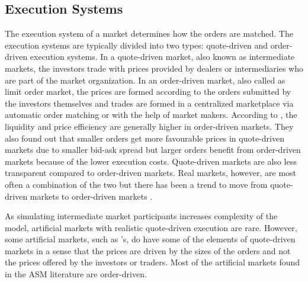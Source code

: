 \subsection{Execution Systems}
The execution system of a market determines how the orders are matched.
The execution systems are typically divided into two types:
quote-driven and order-driven execution systems. In a quote-driven market, also known
as intermediate markets, the investors trade with prices provided 
by dealers or intermediaries who are part of the market organization. 
In an order-driven market, also called as limit order market, 
the prices are formed according to the orders submitted by the 
investors themselves and trades are formed in a centralized marketplace 
via automatic order matching or with the help of market makers. 
\citep{Baru17} According to \citet{MALINOVA2013104},
the liquidity and price efficiency are generally higher in order-driven 
markets. They also found out that smaller orders get more favourable prices in 
quote-driven markets due to smaller bid-ask spread 
but larger orders benefit from order-driven markets because of the lower 
execution costs. Quote-driven markets are also less transparent compared
to order-driven markets. Real markets, however, are most often a combination
of the two \citep{boer05} but there has been a trend to move from quote-driven
markets to order-driven markets \citep{MALINOVA2013104}.

As simulating intermediate market participants increases complexity
of the model, artificial markets with realistic quote-driven execution are rare. 
However, some artificial markets, such as \citet{SantaFe99}'s, do have some of 
the elements of quote-driven markets in a sense that the prices are driven by 
the sizes of the orders and not the prices offered by the investors or traders. 
Most of the artificial markets found in the ASM literature are order-driven.

